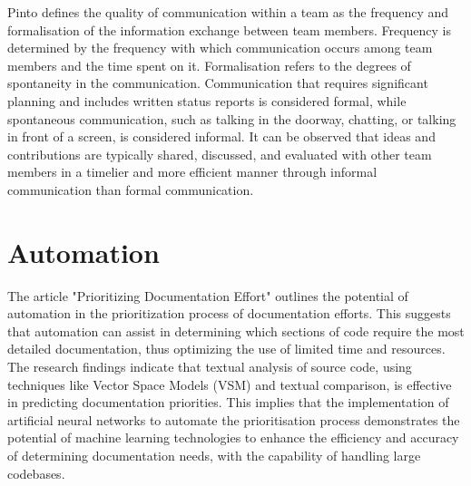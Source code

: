 Pinto \cite{Pinto1990} defines the quality of communication within a team as the frequency and formalisation of the information exchange between team members. Frequency is determined by the frequency with which communication occurs among team members and the time spent on it. Formalisation refers to the degrees of spontaneity in the communication. Communication that requires significant planning and includes written status reports is considered formal, while spontaneous communication, such as talking in the doorway, chatting, or talking in front of a screen, is considered informal. It can be observed that ideas and contributions are typically shared, discussed, and evaluated with other team members in a timelier and more efficient manner through informal communication than formal communication. 


\section{Automation}

The article "Prioritizing Documentation Effort" \cite{McBurney2017PrioritizingDocEffort} outlines the potential of automation in the prioritization process of documentation efforts. This suggests that automation can assist in determining which sections of code require the most detailed documentation, thus optimizing the use of limited time and resources. The research findings indicate that textual analysis of source code, using techniques like Vector Space Models (VSM) and textual comparison, is effective in predicting documentation priorities. This implies that the implementation of artificial neural networks to automate the prioritisation process demonstrates the potential of machine learning technologies to enhance the efficiency and accuracy of determining documentation needs, with the capability of handling large codebases.

